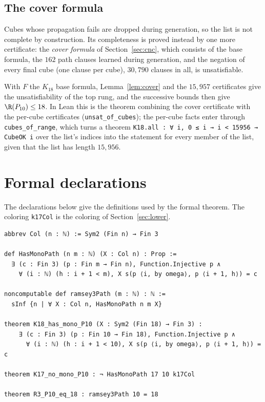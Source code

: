 \subsection{The cover formula}\label{sec:cover}
Cubes whose propagation fails are dropped during generation, so the list is
not complete by construction. Its completeness is proved instead by one
more certificate: the \emph{cover formula} of Section~\ref{sec:cnc}, which consists of the base
formula, the $162$ path clauses learned during generation, and the
negation of every final cube (one clause per cube), $30{,}790$ clauses in
all, is unsatisfiable.

With $F$ the $K_{18}$ base formula, Lemma~\ref{lem:cover} and the
$15{,}957$ certificates give the unsatisfiability of the top rung, and the
successive bounds then give $\R(P_{10})\le18$. In Lean this is the theorem combining
the cover certificate with the per-cube certificates
(\texttt{unsat\_of\_cubes}); the per-cube facts enter through
\texttt{cubes\_of\_range}, which turns a theorem
\texttt{K18.all :\ ∀ i, 0 ≤ i → i < 15956 → CubeOK i} over the list's
indices into the statement for every member of the list, given that the
list has length $15{,}956$.

\section{Formal declarations}\label{note:declarations}
The declarations below give the definitions used by the formal theorem.
The coloring \texttt{k17Col} is the coloring of Section~\ref{sec:lower}.

\begin{Verbatim}
abbrev Col (n : ℕ) := Sym2 (Fin n) → Fin 3

def HasMonoPath (n m : ℕ) (X : Col n) : Prop :=
  ∃ (c : Fin 3) (p : Fin m → Fin n), Function.Injective p ∧
    ∀ (i : ℕ) (h : i + 1 < m), X s(p ⟨i, by omega⟩, p ⟨i + 1, h⟩) = c

noncomputable def ramsey3Path (m : ℕ) : ℕ :=
  sInf {n | ∀ X : Col n, HasMonoPath n m X}

theorem K18_has_mono_P10 (X : Sym2 (Fin 18) → Fin 3) :
    ∃ (c : Fin 3) (p : Fin 10 → Fin 18), Function.Injective p ∧
      ∀ (i : ℕ) (h : i + 1 < 10), X s(p ⟨i, by omega⟩, p ⟨i + 1, h⟩) = c

theorem K17_no_mono_P10 : ¬ HasMonoPath 17 10 k17Col

theorem R3_P10_eq_18 : ramsey3Path 10 = 18
\end{Verbatim}

